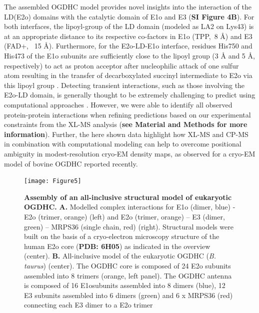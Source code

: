 \documentclass[times, twoside]{zHenriquesLab-StyleBioRxiv}
\begin{document}
The assembled OGDHC model provides novel insights into the interaction of the LD(E2o) domains with the catalytic domain of E1o and E3 (\textbf{SI Figure 4B}). For both interfaces, the lipoyl-group of the LD domain (modeled as LA2 on Lys43) is at an appropriate distance to its respective co-factors in E1o (TPP,~8 Å) and E3 (FAD+, ~15 Å). Furthermore, for the E2o-LD-E1o interface, residues His750 and His473 of the E1o subunits are sufficiently close to the lipoyl group (3 Å and 5 Å, respectively) to act as proton acceptor after nucleophilic attack of one sulfur atom resulting in the transfer of decarboxylated succinyl intermediate to E2o via this lipoyl group \cite{Nemeria_2021, Pan_1998}. Detecting transient interactions, such as those involving the E2o-LD domain, is generally thought to be extremely challenging to predict using computational approaches \cite{Perrakis_2021}. However, we were able to identify all observed protein-protein interactions when refining predictions based on our experimental constraints from the XL-MS analysis (\textbf{see Material and Methods for more information}). Further, the here shown data highlight how XL-MS and CP-MS in combination with computational modeling can help to overcome positional ambiguity in modest-resolution cryo-EM density maps, as observed for a cryo-EM model of bovine OGDHC reported recently\cite{Liu_2022}. 

\begin{figure}[h]
    \centering
    \texttt{[image: Figure5]}
    \caption{\textbf{Assembly of an all-inclusive structural model of eukaryotic OGDHC.} \textbf{A.} Modelled complex interactions for E1o (dimer, blue) - E2o (trimer, orange) (left) and E2o (trimer, orange) – E3 (dimer, green) – MRPS36 (single chain, red) (right). Structural models were built on the basis of a cryo-electron microscopy structure of the human E2o core \cite{Nagy_2021} (\textbf{PDB: 6H05}) as indicated in the overview (center). \textbf{B.}  All-inclusive model of the eukaryotic OGDHC (\emph{B. taurus}) (center). The OGDHC core is composed of 24 E2o subunits assembled into 8 trimers (orange, left panel). The OGDHC antenna is composed of 16 E1osubunits assembled into 8 dimers (blue), 12 E3 subunits assembled into 6 dimers (green) and 6 x MRPS36 (red) connecting each E3 dimer to a E2o trimer}
    \label{fig:img1}
\end{figure}
\end{document}

